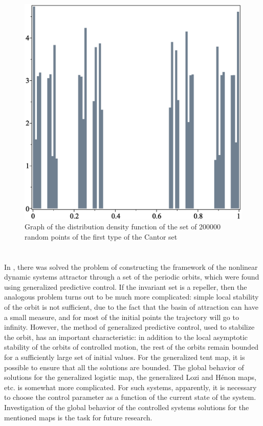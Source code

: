 \documentclass[12pt,a4paper]{amsart}
\begin{document}
\begin{figure}[h!]
\centering
\includegraphics[scale=0.28]{Fig16}
\caption{Graph of the distribution density function of the set of 200000 random points of the first type of the Cantor set} \label{f16}
\end{figure}

\section{}

In \cite{DSI}, there was solved the problem of constructing the framework of the nonlinear dynamic systems attractor through a set of the periodic orbits, which were 
found using generalized predictive control. If the invariant set is a repeller, then the analogous problem turns out to be much more complicated: simple local stability 
of the orbit is not sufficient, due to the fact that the basin of attraction can have a small measure, and for most of the initial points the trajectory will go to infinity. 
However, the method of generalized predictive control, used to stabilize the orbit, has an important characteristic: in addition to the local asymptotic stability 
of the orbits of controlled motion, the rest of the orbits remain bounded for a sufficiently large set of initial values. For the generalized tent map, it is possible to ensure 
that all the solutions are bounded. The global behavior of solutions for the generalized logistic map, the generalized Lozi \cite{Lozi1} and H\'enon maps, etc. is somewhat more complicated. 
For such systems, apparently, it is necessary to choose the control parameter as a function of the current state of the system. Investigation of the global behavior of 
the controlled systems solutions for the mentioned maps is the task for future research.




\end{document}

